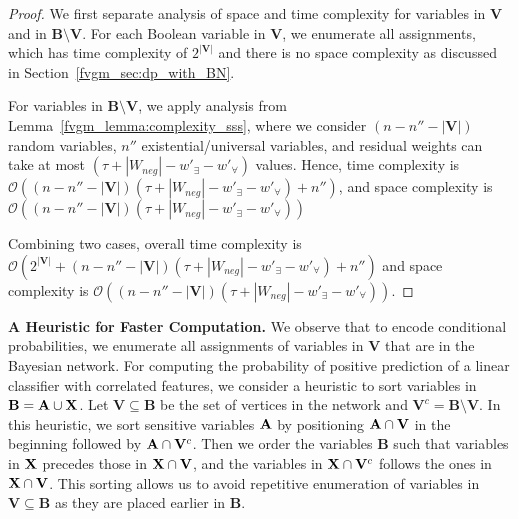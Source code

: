 \begin{proof}
	We first separate analysis of space and time complexity for variables in $ \mathbf{V} $ and in $\mathbf{B}\setminus \mathbf{V} $. For each Boolean variable in $ \mathbf{V} $, we enumerate all assignments, which has time complexity of $ 2^{|\mathbf{V}|} $ and there is no space complexity as discussed in Section~\ref{fvgm_sec:dp_with_BN}. 
	
	
	For variables in $\mathbf{B}\setminus \mathbf{V} $, we apply analysis from  Lemma~\ref{fvgm_lemma:complexity_sss}, where we consider $ (n - n'' - |\mathbf{V}|) $ random variables, $ n'' $ existential/universal variables, and residual weights can take at most $ (\tau + |W_{neg}| - w'_{\exists} - w'_{\forall}) $ values. Hence, time complexity is $ \mathcal{O}((n - n'' - |\mathbf{V}|)(\tau + |W_{neg}| - w'_{\exists} - w'_{\forall}) + n'') $, and space complexity is $ \mathcal{O}((n - n'' - |\mathbf{V}|)(\tau + |W_{neg}| - w'_{\exists} - w'_{\forall})) $ 
	
	Combining two cases, overall time complexity is $ \mathcal{O}(2^{|\mathbf{V}|} + (n - n'' - |\mathbf{V}|)(\tau + |W_{neg}| - w'_{\exists} - w'_{\forall}) + n'') $ and space complexity is $ \mathcal{O}((n - n'' - |\mathbf{V}|)(\tau + |W_{neg}| - w'_{\exists} - w'_{\forall})) $. 
\end{proof}

\textbf{A Heuristic for Faster Computation.} We observe that to encode conditional probabilities, we enumerate all assignments of variables in $ \mathbf{V} $ that are in the Bayesian network. For computing the probability of positive prediction of a linear classifier with correlated features, we consider a heuristic to sort variables in $ \mathbf{B} = \mathbf{A} \cup \mathbf{X} $. Let $ \mathbf{V} \subseteq \mathbf{B} $ be the set of vertices in the network and $ \mathbf{V}^c = \mathbf{B} \setminus \mathbf{V} $. In this heuristic, we sort sensitive variables $ \mathbf{A} $ by positioning $ \mathbf{A} \cap \mathbf{V} $ in the beginning followed by $ \mathbf{A} \cap \mathbf{V}^c $. Then we order the variables $ \mathbf{B} $ such that variables in $ \mathbf{X} $ precedes those in $ \mathbf{X} \cap \mathbf{V} $, and the variables in $ \mathbf{X} \cap \mathbf{V}^c $ follows the ones in $ \mathbf{X} \cap \mathbf{V} $. This sorting allows us to avoid repetitive enumeration of variables in $ \mathbf{V} \subseteq \mathbf{B} $ as they are placed earlier in $ \mathbf{B} $.

